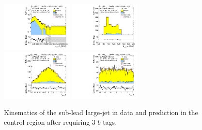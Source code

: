 \begin{figure}[htbp!]
\begin{center}
\includegraphics[width=0.32\textwidth,angle=-90]{figures/boosted/Control/b77_ThreeTag_Control_sublHCand_Pt_m_1.pdf}
\includegraphics[width=0.32\textwidth,angle=-90]{figures/boosted/Control/b77_ThreeTag_Control_sublHCand_Mass_s.pdf}\\
\includegraphics[width=0.32\textwidth,angle=-90]{figures/boosted/Control/b77_ThreeTag_Control_sublHCand_Eta.pdf}
\includegraphics[width=0.32\textwidth,angle=-90]{figures/boosted/Control/b77_ThreeTag_Control_sublHCand_Phi.pdf}
  \caption{Kinematics of the sub-lead large-\R jet in data and prediction in the control region after requiring 3 $b$-tags. }
  \label{fig:boosted-3b-control-ak10-subl}
\end{center}
\end{figure}

